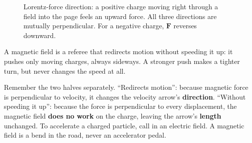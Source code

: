 \begin{figure}[htbp]
\centering
{}
\caption{Lorentz-force direction: a positive charge moving right through a field into the page feels an upward force. All three directions are mutually perpendicular. For a negative charge, $\bm F$ reverses downward.}
\end{figure}


\begin{oneline}
A magnetic field is a referee that redirects motion without speeding it up: it pushes only moving charges, always sideways. A stronger push makes a tighter turn, but never changes the speed at all.
\end{oneline}

\begin{mainline}
Remember the two halves separately. ``Redirects motion'': because magnetic force is perpendicular to velocity, it changes the velocity arrow's \textbf{direction}. ``Without speeding it up'': because the force is perpendicular to every displacement, the magnetic field \textbf{does no work} on the charge, leaving the arrow's \textbf{length} unchanged. To accelerate a charged particle, call in an electric field. A magnetic field is a bend in the road, never an accelerator pedal.
\end{mainline}


